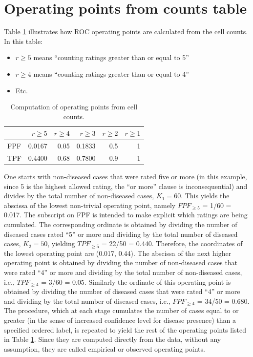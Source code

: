 \documentclass[
]{book}
\providecommand{\tightlist}{%
  \setlength{\itemsep}{0pt}\setlength{\parskip}{0pt}}
\begin{document}
\hypertarget{ratings-task-operating-points-from-counts-table}{%
\section{Operating points from counts table}\label{ratings-task-operating-points-from-counts-table}}

Table \ref{tab:ratings-paradigm-table-2} illustrates how ROC operating points are calculated from the cell counts. In this table:

\begin{itemize}
\tightlist
\item
  \(r\geq 5\) means ``counting ratings greater than or equal to 5''
\item
  \(r\geq 4\) means ``counting ratings greater than or equal to 4''
\item
  Etc.
\end{itemize}

\begin{table}

\caption{\label{tab:ratings-paradigm-table-2}Computation of operating points from cell counts.}
\centering
\begin{tabular}[t]{l|r|r|r|r|r}
\hline
  & $r\geq 5$ & $r\geq 4$ & $r\geq 3$ & $r\geq 2$ & $r\geq 1$\\
\hline
FPF & 0.0167 & 0.05 & 0.1833 & 0.5 & 1\\
\hline
TPF & 0.4400 & 0.68 & 0.7800 & 0.9 & 1\\
\hline
\end{tabular}
\end{table}

One starts with non-diseased cases that were rated five or more (in this example, since 5 is the highest allowed rating, the ``or more'' clause is inconsequential) and divides by the total number of non-diseased cases, \(K_1 = 60\). This yields the abscissa of the lowest non-trivial operating point, namely \(FPF_{\ge5}\) = 1/60 = 0.017. The subscript on FPF is intended to make explicit which ratings are being cumulated. The corresponding ordinate is obtained by dividing the number of diseased cases rated ``5'' or more and dividing by the total number of diseased cases, \(K_2 = 50\), yielding \(TPF_{\ge5}\) = 22/50 = 0.440. Therefore, the coordinates of the lowest operating point are (0.017, 0.44). The abscissa of the next higher operating point is obtained by dividing the number of non-diseased cases that were rated ``4'' or more and dividing by the total number of non-diseased cases, i.e., \(TPF_{\ge4}\) = 3/60 = 0.05. Similarly the ordinate of this operating point is obtained by dividing the number of diseased cases that were rated ``4'' or more and dividing by the total number of diseased cases, i.e., \(FPF_{\ge4}\) = 34/50 = 0.680. The procedure, which at each stage cumulates the number of cases equal to or greater (in the sense of increased confidence level for disease presence) than a specified ordered label, is repeated to yield the rest of the operating points listed in Table \ref{tab:ratings-paradigm-table-2}. Since they are computed directly from the data, without any assumption, they are called empirical or observed operating points.
\end{document}
